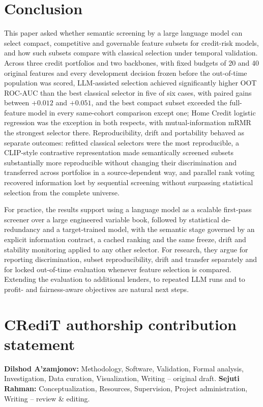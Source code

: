 \documentclass[final,5p,twocolumn]{elsarticle}
\begin{document}
\section{Conclusion}
\label{sec:conclusion}

This paper asked whether semantic screening by a large language model can select compact, competitive and governable feature subsets for credit-risk models, and how such subsets compare with classical selection under temporal validation. Across three credit portfolios and two backbones, with fixed budgets of 20 and 40 original features and every development decision frozen before the out-of-time population was scored, LLM-assisted selection achieved significantly higher OOT ROC-AUC than the best classical selector in five of six cases, with paired gains between $+0.012$ and $+0.051$, and the best compact subset exceeded the full-feature model in every same-cohort comparison except one; Home Credit logistic regression was the exception in both respects, with mutual-information mRMR the strongest selector there. Reproducibility, drift and portability behaved as separate outcomes: refitted classical selectors were the most reproducible, a CLIP-style contrastive representation made semantically screened subsets substantially more reproducible without changing their discrimination and transferred across portfolios in a source-dependent way, and parallel rank voting recovered information lost by sequential screening without surpassing statistical selection from the complete universe.

For practice, the results support using a language model as a scalable first-pass screener over a large engineered variable book, followed by statistical de-redundancy and a target-trained model, with the semantic stage governed by an explicit information contract, a cached ranking and the same freeze, drift and stability monitoring applied to any other selector. For research, they argue for reporting discrimination, subset reproducibility, drift and transfer separately and for locked out-of-time evaluation whenever feature selection is compared. Extending the evaluation to additional lenders, to repeated LLM runs and to profit- and fairness-aware objectives are natural next steps.


\section*{CRediT authorship contribution statement}
\textbf{Dilshod A'zamjonov:} Methodology, Software, Validation, Formal analysis, Investigation, Data curation, Visualization, Writing -- original draft. \textbf{Sejuti Rahman:} Conceptualization, Resources, Supervision, Project administration, Writing -- review \& editing.
\end{document}
